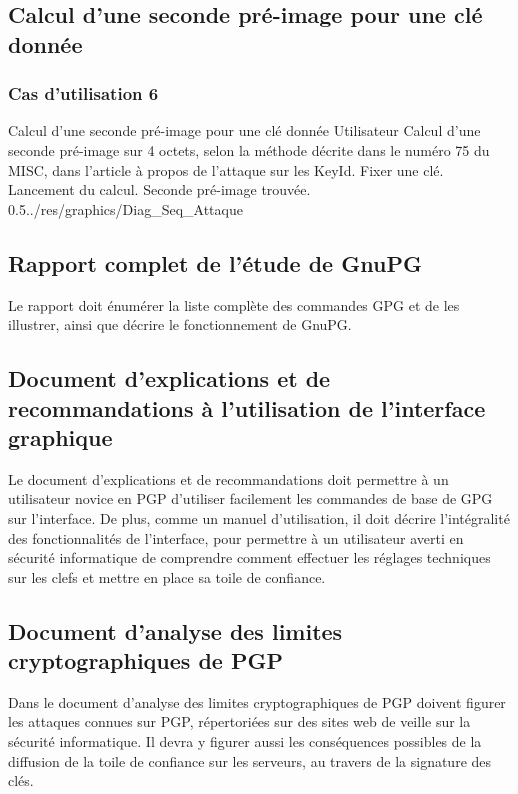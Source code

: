 \documentclass{../res/univ-projet}
\begin{document}
\subsection{Calcul d'une seconde pré-image pour une clé donnée}
  
\subsubsection{Cas d'utilisation 6}
\ficheGraphic
{Calcul d'une seconde pré-image pour une clé donnée}
{Utilisateur}
{Calcul d'une seconde pré-image sur 4 octets, selon la méthode décrite dans le numéro 75 du MISC, dans l'article à propos de l'attaque sur les KeyId.}
{Fixer une clé.}
{Lancement du calcul.}
{Seconde pré-image trouvée.}
{0.5}{../res/graphics/Diag_Seq_Attaque}
{}
\vspace{0.5cm}


\subsection{Rapport complet de l'étude de GnuPG}

Le rapport doit énumérer la liste complète des commandes GPG et de les illustrer, ainsi que décrire le fonctionnement de GnuPG.


\subsection{Document d'explications et de recommandations à l'utilisation de l'interface graphique}

Le document d'explications et de recommandations doit permettre à un utilisateur novice en PGP d'utiliser facilement les commandes de base de GPG sur l'interface.
De plus, comme un manuel d'utilisation, il doit décrire l'intégralité des fonctionnalités de l'interface, pour permettre à un utilisateur averti en sécurité informatique de comprendre comment effectuer les réglages techniques sur les clefs et mettre en place sa toile de confiance.


\subsection{Document d'analyse des limites cryptographiques de PGP}

Dans le document d'analyse des limites cryptographiques de PGP doivent figurer les attaques connues sur PGP, répertoriées sur des sites web de veille sur la sécurité informatique. Il devra y figurer aussi les conséquences possibles de la diffusion de la toile de confiance sur les serveurs, au travers de la signature des clés.
\end{document}
